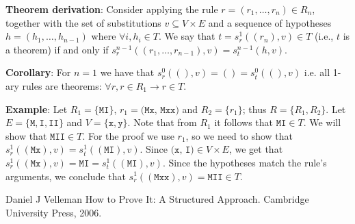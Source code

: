 \documentclass{article}
\begin{document}
\textbf{Theorem derivation}: Consider applying the rule $r = (r_1, \ldots, r_n) \in R_n$, together with the set of substitutions $v \subseteq V \times E$ and a sequence of hypotheses $h = (h_1, \ldots, h_{n-1})$ where $\forall i, h_i \in T$. We say that $t = s_r^1((r_n),v) \in T$ (i.e., $t$ is a theorem) if and only if $s_r^{n-1}((r_1, \ldots, r_{n-1}), v) = s_t^{n-1}(h, v)$.

\textbf{Corollary}: For $n = 1$ we have that $s_r^0((), v) = () = s_t^0((), v)$ i.e. all 1-ary rules are theorems: $\forall r, r \in R_1 \to r \in T$.

\textbf{Example}: Let $R_1 = \{ \texttt{MI} \}$, $r_1 = \texttt{(Mx, Mxx)}$ and $R_2 = \{ r_1 \}$; thus $R = \{ R_1, R_2 \}$. Let $E = \{ \texttt{M}, \texttt{I}, \texttt{II} \}$ and $V = \{ \texttt{x}, \texttt{y} \}$. Note that from $R_1$ it follows that $\texttt{MI} \in T$. We will show that $\texttt{MII} \in T$. For the proof we use $r_1$, so we need to show that $s_r^1((\texttt{Mx}), v) = s_t^1((\texttt{MI}), v)$. Since $\texttt{(x, I)} \in V \times E$, we get that $s_r^1((\texttt{Mx}), v) = \texttt{MI} = s_t^1((\texttt{MI}), v)$. Since the hypotheses match the rule's arguments, we conclude that $s_r^1((\texttt{Mxx}),v) = \texttt{MII} \in T$.

\begin{thebibliography}{1}

Daniel J Velleman
\newblock How to Prove It: A Structured Approach.
\newblock Cambridge University Press, 2006.

\end{thebibliography}
\end{document}
